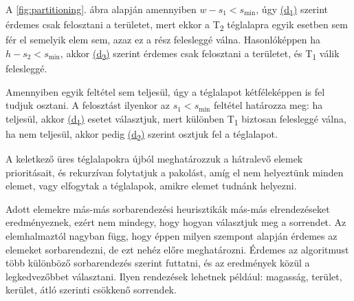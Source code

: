 A \ref{fig:partitioning}. ábra alapján amennyiben $w - s_1 < s_\text{min}$, úgy \href{fig:partitioning}{(d\textsubscript{1})} szerint érdemes csak felosztani a területet, mert ekkor a T\textsubscript{2} téglalapra egyik esetben sem fér el semelyik elem sem, azaz ez a rész felesleggé válna.
Hasonlóképpen ha $h - s_2 < s_\text{min}$, akkor \href{fig:partitioning}{(d\textsubscript{2})} szerint érdemes csak felosztani a területet, és T\textsubscript{1} válik felesleggé. 

Amennyiben egyik feltétel sem teljesül, úgy a téglalapot kétféleképpen is fel tudjuk osztani. 
A felosztást ilyenkor az $s_1 < s_\text{min}$ feltétel határozza meg: ha teljesül, akkor \href{fig:partitioning}{(d\textsubscript{1})} esetet választjuk, mert különben T\textsubscript{1} biztosan felesleggé válna, ha nem teljesül, akkor pedig \href{fig:partitioning}{(d\textsubscript{2})} szerint osztjuk fel a téglalapot.

A keletkező üres téglalapokra újból meghatározzuk a hátralevő elemek prioritásait, és rekurzívan folytatjuk a pakolást, amíg el nem helyeztünk minden elemet, vagy elfogytak a téglalapok, amikre elemet tudnánk helyezni.

Adott elemekre más-más sorbarendezési heurisztikák más-más elrendezéseket eredményeznek, ezért nem mindegy, hogy hogyan választjuk meg a sorrendet. Az elemhalmaztól nagyban függ, hogy éppen milyen szempont alapján érdemes az elemeket sorbarendezni, de ezt nehéz előre meghatározni. Érdemes az algoritmust több különböző sorbarendezés szerint futtatni, és az eredmények közül a legkedvezőbbet választani. Ilyen rendezések lehetnek például: magasság, terület, kerület, átló szerinti csökkenő sorrendek.
